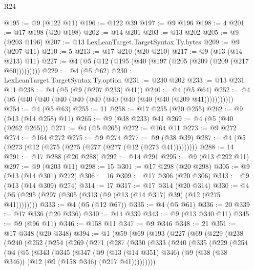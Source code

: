 \begin{lexlean}{R24}
\begin{coremodule}
@195 := @9 (@122 @11)
@196 := @122 @39
@197 := @9 @196
@198 := 4
@201 := @17 @198 (@20 @198)
@202 := @14 @201
@203 := @13 @202
@205 := @9 (@203 @196)
@207 := @13 LexLeanTarget.TargetSyntax.Ty.bytes
@209 := @9 (@207 @11)
@210 := 5
@213 := @17 @210 (@20 @210)
@217 := @9 (@13 (@14 @213) @11)
@227 := @4 (@5 (@12 (@195 (@40 (@197 (@205 (@209 (@209 (@217 @60)))))))))
@229 := @4 (@5 @62)
@230 := LexLeanTarget.TargetSyntax.Ty.option
@231 := @230 @202
@233 := @13 @231 @11
@238 := @4 (@5 (@9 (@207 @233) @41))
@240 := @4 (@5 @64)
@252 := @4 (@5 (@40 (@40 (@40 (@40 (@40 (@40 (@40 (@40 (@40 (@209 @41)))))))))))
@254 := @4 (@5 @63)
@255 := 11
@258 := @17 @255 (@20 @255)
@262 := @9 (@13 (@14 @258) @11)
@265 := @9 (@38 @233) @41
@269 := @4 (@5 (@40 (@262 @265)))
@271 := @4 (@5 @265)
@272 := @164 @11
@273 := @9 @272
@274 := @164 @272
@275 := @9 @274
@277 := @9 (@38 @39)
@287 := @4 (@5 (@273 (@12 (@275 (@275 (@277 (@277 (@12 (@273 @41)))))))))
@288 := 14
@291 := @17 @288 (@20 @288)
@292 := @14 @291
@295 := @9 (@13 @292 @11)
@297 := @9 (@203 @11)
@298 := 15
@301 := @17 @298 (@20 @298)
@305 := @9 (@13 (@14 @301) @272)
@306 := 16
@309 := @17 @306 (@20 @306)
@313 := @9 (@13 (@14 @309) @274)
@314 := 17
@317 := @17 @314 (@20 @314)
@330 := @4 (@5 (@295 (@297 (@305 (@313 (@9 (@13 (@14 @317) @39) (@12 (@275 @41))))))))
@333 := @4 (@5 (@12 @67))
@335 := @4 (@5 @61)
@336 := 20
@339 := @17 @336 (@20 @336)
@340 := @14 @339
@343 := @9 (@13 @340 @11)
@345 := @9 (@96 @11)
@346 := @158 @11
@347 := @9 @346
@348 := 21
@351 := @17 @348 (@20 @348)
@394 := @1
    (@59
      (@69
        (@193
          (@227
            (@69
              (@229
                (@238
                  (@240
                    (@252
                      (@254
                        (@269
                          (@271
                            (@287
                              (@330
                                (@333
                                  (@240
                                    (@335
                                      (@229
                                        (@254
                                          (@4
                                            (@5
                                              (@343
                                                (@345
                                                  (@347
                                                    (@9
                                                      (@13 (@14 @351) @346)
                                                      (@9
                                                        (@38 (@38 @346))
                                                        (@12 (@9 (@158 @346) (@217 @41)))))))))

\end{coremodule}
\end{lexlean}
